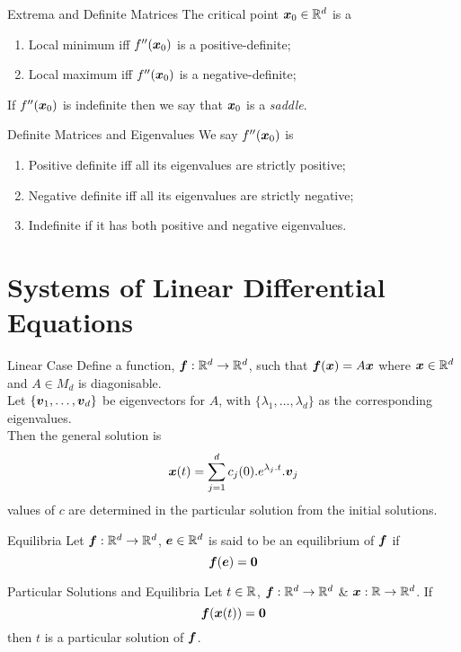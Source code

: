 \documentclass[11pt,a4paper]{article}
\begin{document}
\subtitle{Theorem 15.10}{Extrema and Definite Matrices}
The critical point $\boldsymbol{x}_0 \in \mathbb{R}^d$ is a
\begin{enumerate}[label=\roman*)]
  \item Local minimum iff $f''(\boldsymbol{x}_0)$ is a positive-definite;
  \item Local maximum iff $f''(\boldsymbol{x}_0)$ is a negative-definite;
\end{enumerate}
If $f''(\boldsymbol{x}_0)$ is indefinite then we say that $\boldsymbol{x}_0$ is a \textit{saddle}.\\

\subtitle{Theorem 15.11 - }{Definite Matrices and Eigenvalues}
We say $f''(\boldsymbol{x}_0)$ is
\begin{enumerate}[label=\roman*)]
  \item Positive definite iff all its eigenvalues are strictly positive;
  \item Negative definite iff all its eigenvalues are strictly negative;
  \item Indefinite if it has both positive and negative eigenvalues.
\end{enumerate}

\section{Systems of Linear Differential Equations}

\subtitle{Theorem 16.1 - }{Linear Case}
Define a function, $\boldsymbol{f} : \mathbb{R}^d \to \mathbb{R}^d$, such that $\boldsymbol{f}(\boldsymbol{x}) = A\boldsymbol{x}$ where $\boldsymbol{x} \in \mathbb{R}^d$ and $A \in M_d$ is diagonisable.\\
Let $\{\boldsymbol{v}_1 , \dots , \boldsymbol{v}_d \}$ be eigenvectors for $A$, with $\{ \lambda_1 , \dots , \lambda_d \}$ as the corresponding eigenvalues.\\
Then the general solution is $$\boldsymbol{x}(t) = \sum_{j=1}^d c_j(0) . e^{\lambda_j.t}.\boldsymbol{v}_j$$ values of $c$ are determined in the particular solution from the initial solutions.\\

\subtitle{Definition 16.2 - }{Equilibria}
Let $\boldsymbol{f} : \mathbb{R}^d \to \mathbb{R}^d$, $\boldsymbol{e} \in \mathbb{R}^d$ is said to be an equilibrium of $\boldsymbol{f}$ if
$$\boldsymbol{f}(\boldsymbol{e}) = \boldsymbol{0}$$

\subtitle{Theorem 16.3 - }{Particular Solutions and Equilibria}
Let $t \in \mathbb{R}$, $\boldsymbol{f} : \mathbb{R}^d \to \mathbb{R}^d$ \& $\boldsymbol{x} : \mathbb{R} \to \mathbb{R}^d$. If
$$\boldsymbol{f}(\boldsymbol{x}(t)) = \boldsymbol{0} $$
then $t$ is a particular solution of $\boldsymbol{f}$.\\
\end{document}
